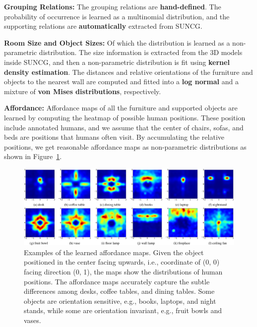 \documentclass[10pt]{article}
\newcommand{\Fig}[1]{Figure~\ref{fig:#1}}
\begin{document}
\textbf{Grouping Relations:} The grouping relations are \textbf{hand-defined}.
The probability of occurrence is learned as a multinomial distribution, and the
supporting relations are \textbf{automatically} extracted from SUNCG\@.

\textbf{Room Size and Object Sizes:} Of which the distribution is learned as
a non-parametric distribution. The size information is extracted from the 3D
models inside SUNCG, and then a non-parametric distribution is fit using
\textbf{kernel density estimation}. The distances and relative orientations of
the furniture and objects to the nearest wall are computed and fitted into a
\textbf{log normal} and a mixture of \textbf{von Mises distributions},
respectively.

\textbf{Affordance:} Affordance maps of all the furniture and supported objects
are learned by computing the heatmap of possible human positions. These
position include annotated humans, and we assume that the center of chairs,
sofas, and beds are positions that humans often visit. By accumulating the
relative positions, we get reasonable affordance maps as non-parametric
distributions as shown in \Fig{5}.
%
\begin{figure}[!htpb]
  \centering
  \includegraphics[width=0.9\linewidth]{fig_5.png}
  \caption{Examples of the learned affordance maps. Given the object positioned
    in the center facing upwards, i.e., coordinate of (0, 0) facing direction
    (0, 1), the maps show the distributions of human positions. The affordance
    maps accurately capture the subtle differences among desks, coffee tables,
    and dining tables. Some objects are orientation sensitive, e.g., books,
    laptops, and night stands, while some are orientation invariant, e.g.,
    fruit bowls and vases.}%
  \label{fig:5}
\end{figure}


\end{document}
